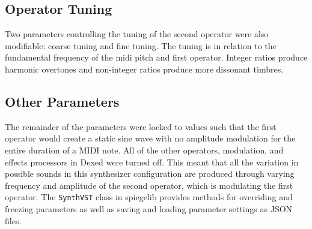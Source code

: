 \subsection{Operator Tuning}
Two parameters controlling the tuning of the second operator were also modifiable: coarse tuning and fine tuning. The tuning is in relation to the fundamental frequency of the midi pitch and first operator. Integer ratios produce harmonic overtones and non-integer ratios produce more dissonant timbres.

\subsection{Other Parameters}
The remainder of the parameters were locked to values such that the first operator would create a static sine wave with no amplitude modulation for the entire duration of a MIDI note. All of the other operators, modulation, and effects processors in Dexed were turned off. This meant that all the variation in possible sounds in this synthesizer configuration are produced through varying frequency and amplitude of the second operator, which is modulating the first operator. The \texttt{SynthVST} class in spiegelib provides methods for overriding and freezing parameters as well as saving and loading parameter settings as JSON files. 

%

